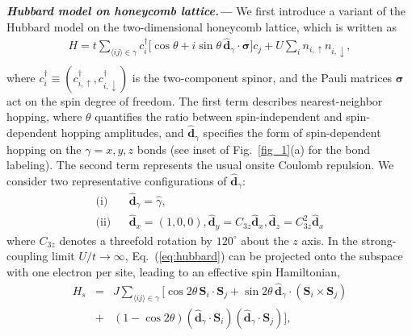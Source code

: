 \documentclass[aps,prl,twocolumn,showpacs,superscriptaddress]{revtex4-2}
\newcommand{\bea}{\begin{eqnarray}}
\newcommand{\eea}{\end{eqnarray}}
\newcommand{\bs}{\boldsymbol}
\begin{document}
\textbf{\textit{Hubbard model on honeycomb lattice.---}}
We first introduce a variant of the Hubbard model on the two-dimensional honeycomb lattice, which is written as
\small
\bea
\nonumber
H = t \sum_{\langle ij \rangle \in \gamma }
c_{i}^\dagger
\big[\cos{\theta} + i \sin{\theta} \, \hat{\bs d}_{\gamma} \! \cdot \! \bs \sigma \big]
c_{j}
+ U \sum_i n_{i,\uparrow} n_{i,\downarrow},
\\
\label{eq:hubbard}
\eea
\normalsize
where $c_{i}^\dagger \!\equiv\! (c^\dagger_{i,\uparrow}, c^\dagger_{i,\downarrow})$ is the two-component spinor, and the Pauli matrices $\bs \sigma$ act on the spin degree of freedom. The first term describes nearest-neighbor hopping, where $\theta$ quantifies the ratio between spin-independent and spin-dependent hopping amplitudes, and $\hat{\bs d}_{\gamma}$ specifies the form of spin-dependent hopping on the $\gamma = x, y, z$ bonds (see inset of Fig.~\ref{fig_1}(a) for the bond labeling). The second term represents the usual onsite Coulomb repulsion. We consider two representative configurations of $\hat{\bs d}_{\gamma}$:
\bea
\text{(i)}&&\hat{\bs d}_{\gamma} = \hat{\gamma},
\label{eq:d_1}
\\
\text{(ii)}&&\hat{\bs d}_{x} = (1,0,0), \hat{\bs d}_{y} = C_{3z}\hat{\bs d}_{x}, \hat{\bs d}_{z} = C^2_{3z}\hat{\bs d}_{x}
\label{eq:d_2}
\eea
where $C_{3z}$ denotes a threefold rotation by $120^\circ$ about the $z$ axis. In the strong-coupling limit $U/t \!\to\! \infty$, Eq.~(\ref{eq:hubbard}) can be projected onto the subspace with one electron per site, leading to an effective spin Hamiltonian,
\bea
\nonumber
H_s &=& J \sum_{\langle ij \rangle \in \gamma} \big[\cos{2\theta}\, \bs{S}_i \!\cdot\! \bs{S}_j
+ \sin{2\theta}\, \hat{\bs d}_{\gamma} \!\cdot\! (\bs{S}_i \!\times\! \bs{S}_j)
\\
&+& (1 - \cos{2\theta}) (\hat{\bs d}_{\gamma} \!\cdot\! \bs{S}_i)(\hat{\bs d}_{\gamma} \!\cdot\! \bs{S}_j)
\big],
\label{eq:spin}
\eea
\end{document}
